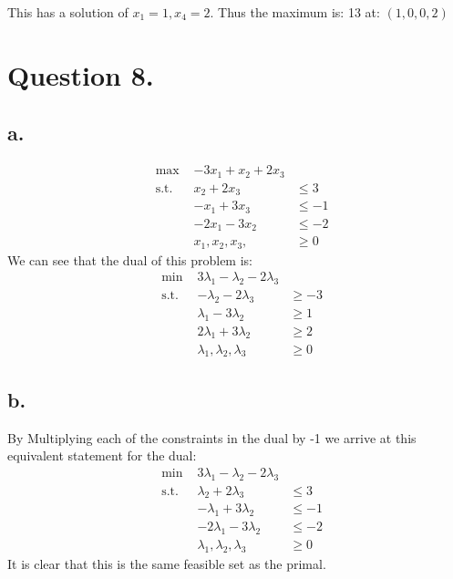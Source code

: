 \documentclass[10pt, letterpaper]{paper}
\begin{document}
This has a solution of $x_1 = 1, x_4 = 2$. Thus the maximum is: 13 at: $(1,0,0,2)$

\section*{Question 8.}
\subsection*{a.}
\begin{equation*}
\begin{alignedat}{3}
&\text{max }&-3x_1 + x_2 + 2x_3 &\\
&\text{s.t. } &x_2 + 2x_3 &\leq 3\\
& &-x_1 + 3x_3 &\leq -1\\
& &-2x_1 - 3x_2 &\leq -2\\
& &x_1, x_2, x_3, &\geq 0
\end{alignedat}
\end{equation*}
We can see that the dual of this problem is: 
\begin{equation*}
\begin{alignedat}{3}
&\text{min }&3\lambda_1 - \lambda_2 - 2\lambda_3&\\
&\text{s.t. } & -\lambda_2 -2\lambda_3 &\geq -3\\
& &\lambda_1 - 3\lambda_2 &\geq 1\\
& &2\lambda_1 + 3\lambda_2 &\geq 2\\
& &\lambda_1, \lambda_2, \lambda_3 &\geq 0
\end{alignedat}
\end{equation*}

\subsection*{b.}
By Multiplying each of the constraints in the dual by -1 we arrive at this equivalent statement for the dual: 
\begin{equation*}
\begin{alignedat}{3}
&\text{min }&3\lambda_1 - \lambda_2 - 2\lambda_3&\\
&\text{s.t. } & \lambda_2 +2\lambda_3 &\leq 3\\
& &-\lambda_1 + 3\lambda_2 &\leq -1\\
& &-2\lambda_1 - 3\lambda_2 &\leq -2\\
& &\lambda_1, \lambda_2, \lambda_3 &\geq 0
\end{alignedat}
\end{equation*}
It is clear that this is the same feasible set as the primal.
\end{document}
